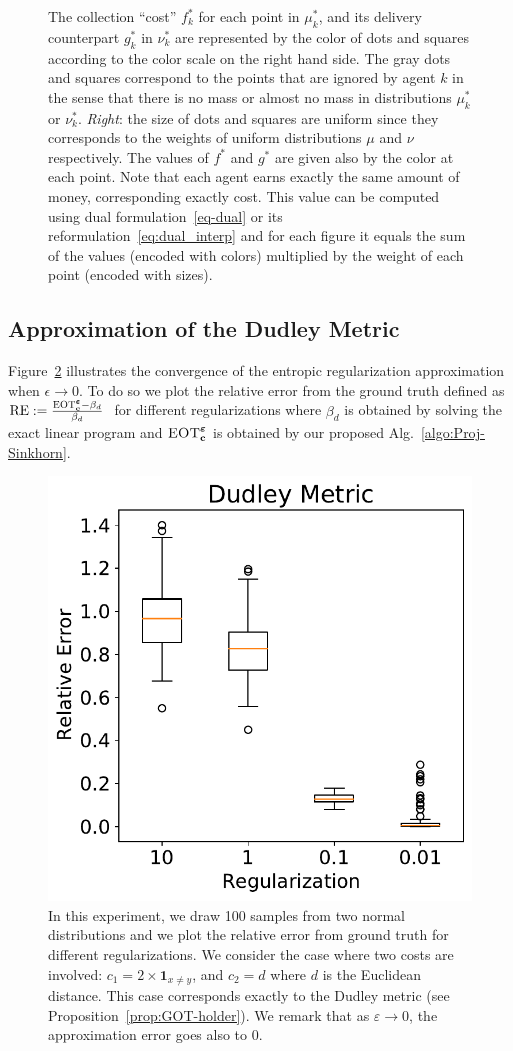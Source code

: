 \begin{figure}[h!]
{The collection ``cost'' $f_k^{*}$ for each point in $\mu_k^{*}$, and its delivery counterpart $g_k^{*}$ in $\nu_k^{*}$ are represented by the color of dots and squares according to the color scale on the right hand side. The gray dots and squares correspond to the points that are ignored by agent $k$ in the sense that there is no mass or almost no mass in distributions $\mu^*_k$ or $\nu^*_k$. \emph{Right}: the size of dots and squares are uniform since they corresponds to the weights of uniform distributions $\mu$ and $\nu$ respectively. The values of $f^*$ and $g^*$ are given also by the color at each point. Note that each agent earns exactly the same amount of money, corresponding exactly \MOT cost. This value can be computed using dual formulation~\eqref{eq-dual} or its reformulation~\eqref{eq:dual_interp} and for each figure it equals the sum of the values (encoded with colors) multiplied by the weight of each point (encoded with sizes).}
\label{fig:potential-dual-ot-viewpoint}
\end{figure}

\newpage

\subsection{Approximation of the Dudley Metric}

Figure~\ref{fig:result_acc} illustrates the convergence of the entropic regularization approximation when $\epsilon\to 0$. To do so  we plot the relative error from the ground truth defined as $\text{RE}:= \frac{ \textsc{EOT}_{\mathbf{c}}^{\bm{\varepsilon}}-\beta_d}{\beta_d}\ $ for different regularizations where $\beta_d$ is obtained by solving the exact linear program and $\textsc{EOT}_{\mathbf{c}}^{\bm{\varepsilon}}$ is obtained by our proposed Alg.~\ref{algo:Proj-Sinkhorn}.

\begin{figure}[h!]
\centering
\includegraphics[width=0.6\linewidth]{sections/appendix/aistats2021_eot/figures/box_plot_accuracy.pdf}
\caption{In this experiment, we draw 100 samples from two normal distributions and we plot the relative error from ground truth for different regularizations. We consider the case where two costs are involved: $c_1= 2\times\mathbf{1}_{x\neq y}$, and $c_2=d$ where $d$ is the Euclidean distance. This case corresponds exactly to the Dudley metric (see Proposition~\ref{prop:GOT-holder}). We remark that as $\varepsilon\to 0$, the approximation error goes also to $0$.\label{fig:result_acc}}
\end{figure}
